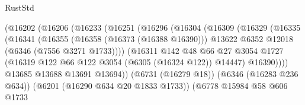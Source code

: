 \begin{lexlean}{RustStd}
\begin{coremodule}
                                    (@16202
                                      (@16206
                                        (@16233
                                          (@16251
                                            (@16296
                                              (@16304
                                                (@16309
                                                  (@16329
                                                    (@16335
                                                      (@16341
                                                        (@16355
                                                          (@16358 (@16373 (@16388 @16390)))
                                                          @13622
                                                          @6352
                                                          @12018
                                                          (@6346 (@7556 @3271 @1733))))
                                                      (@16311
                                                        @142
                                                        @48
                                                        @66
                                                        @27
                                                        @3054
                                                        @1727
                                                        (@16319
                                                          @122
                                                          @66
                                                          @122
                                                          @3054
                                                          (@6305 (@16324 @122))
                                                          @14447)
                                                        @16390))))
                                                @13685
                                                @13688
                                                @13691
                                                @13694))
                                            (@6731 (@16279 @18))
                                            (@6346 (@16283 @236 @634))
                                            (@6201 (@16290 @634 @20 @1833 @1733))
                                            (@6778
                                              @15984
                                              @58
                                              @606
                                              @1733

\end{coremodule}
\end{lexlean}
